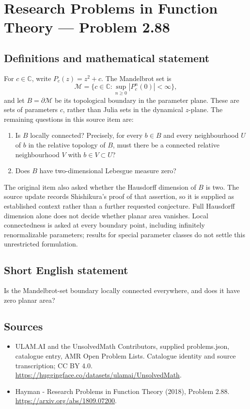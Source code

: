 \documentclass[11pt,a4paper]{article}
\begin{document}
\section*{Research Problems in Function Theory — Problem 2.88}\label{statement}

\subsection{Definitions and mathematical statement}
For $c\in\mathbb C$, write $P_c(z)=z^2+c$. The Mandelbrot set is
\[
\mathcal M=\{c\in\mathbb C:\sup_{n\ge0}|P_c^n(0)|<\infty\},
\]
and let $B=\partial\mathcal M$ be its topological boundary in the parameter plane. These are sets of parameters $c$, rather than Julia sets in the dynamical $z$-plane.
The remaining questions in this source item are:
\begin{enumerate}
\item Is $B$ locally connected? Precisely, for every $b\in B$ and every neighbourhood $U$ of $b$ in the relative topology of $B$, must there be a connected relative neighbourhood $V$ with $b\in V\subset U$?
\item Does $B$ have two-dimensional Lebesgue measure zero?
\end{enumerate}
The original item also asked whether the Hausdorff dimension of $B$ is two. The source update records Shishikura's proof of that assertion, so it is supplied as established context rather than a further requested conjecture. Full Hausdorff dimension alone does not decide whether planar area vanishes. Local connectedness is asked at every boundary point, including infinitely renormalizable parameters; results for special parameter classes do not settle this unrestricted formulation.
\subsection{Short English statement}
Is the Mandelbrot-set boundary locally connected everywhere, and does it have zero planar area?
\subsection{Sources}
\begin{itemize}
\item[S1] ULAM.AI and the UnsolvedMath Contributors, supplied problems.json, catalogue entry, AMR Open Problem Lists. Catalogue identity and source transcription; CC BY 4.0.
\url{https://huggingface.co/datasets/ulamai/UnsolvedMath}.
\item[S2] Hayman - Research Problems in Function Theory (2018), Problem 2.88. 
\url{https://arxiv.org/abs/1809.07200}.
\end{itemize}
\end{document}
